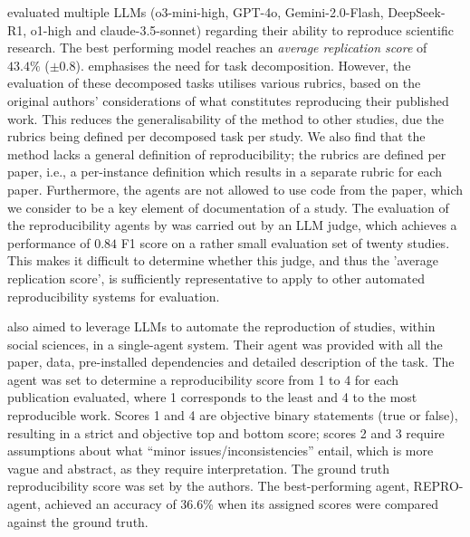 \documentclass[letterpaper]{article} %
\newcommand{\nbc}[3]{
{\colorbox{#3}{\bfseries\sffamily\scriptsize\textcolor{white}{#1}}}
{\textcolor{#3}{\sf\small$\blacktriangleright$\textit{#2}$\blacktriangleleft$}}
}
\newcommand{\hh}[1]{\nbc{HH}{#1}{red}}
\begin{document}
\citet{starace_paperbench_2025} evaluated multiple LLMs (o3-mini-high, GPT-4o, Gemini-2.0-Flash, DeepSeek-R1, o1-high and claude-3.5-sonnet) regarding their ability to reproduce scientific research. The best performing model reaches an \textit{average replication score} of $43.4\%$ ($\pm 0.8$). \citet{starace_paperbench_2025} emphasises the need for task decomposition. However, the evaluation of these decomposed tasks utilises various rubrics, based on the original authors' considerations of what constitutes reproducing their published work. This reduces the generalisability of the method to other studies, due the rubrics being defined per decomposed task per study. We also find that the method lacks a general definition of reproducibility; the rubrics are defined per paper, i.e., a per-instance definition which results in a separate rubric for each paper. Furthermore, the agents are not allowed to use code from the paper, which we consider to be a key element of documentation of a study. The evaluation of the reproducibility agents by \citet{starace_paperbench_2025} was carried out by an LLM judge, which achieves a performance of $0.84$ F1 score on a rather small evaluation set of twenty studies. This makes it difficult to determine whether this judge, and thus the 'average replication score', is sufficiently representative to apply to other automated reproducibility systems for evaluation.

\citet{hu2025repro} also aimed to leverage LLMs to automate the reproduction of studies, within social sciences, in a single-agent system. 
Their agent was provided with all the paper, data, pre-installed dependencies and detailed description of the task. The agent was set to determine a reproducibility score from 1 to 4 for each publication evaluated, where 1 corresponds to the least and 4 to the most reproducible work. Scores 1 and 4 are objective binary statements (true or false), resulting in a strict and objective top and bottom score; scores 2 and 3 require assumptions about what ``minor issues/inconsistencies'' entail, which is more vague and abstract, as they require interpretation. The ground truth reproducibility score was set by the authors.
The best-performing agent, REPRO-agent, achieved an accuracy of 36.6\% when its assigned scores were compared against the ground truth. 
\end{document}
